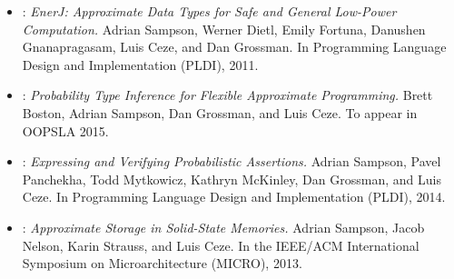 \begin{itemize}
\item {}:
\textit{EnerJ: Approximate Data Types for Safe and General Low-Power
Computation.}
Adrian Sampson, Werner Dietl, Emily Fortuna, Danushen Gnanapragasam, Luis Ceze, and Dan Grossman.
In Programming Language Design and Implementation (PLDI), 2011.
\cite{enerj}

\item {}:
\textit{Probability Type Inference for Flexible Approximate Programming.}
Brett Boston, Adrian Sampson, Dan Grossman, and Luis Ceze.
To appear in OOPSLA 2015.
\cite{decaf}

\item {}:
\textit{Expressing and Verifying Probabilistic Assertions.}
Adrian Sampson, Pavel Panchekha, Todd Mytkowicz, Kathryn McKinley, Dan Grossman, and Luis Ceze.
In Programming Language Design and Implementation (PLDI), 2014.
\cite{passert}

\item {}:
\textit{Approximate Storage in Solid-State Memories.}
Adrian Sampson, Jacob Nelson, Karin Strauss, and Luis Ceze.
In the IEEE/ACM International Symposium on Microarchitecture (MICRO), 2013.
\cite{approxstorage}
\end{itemize}
